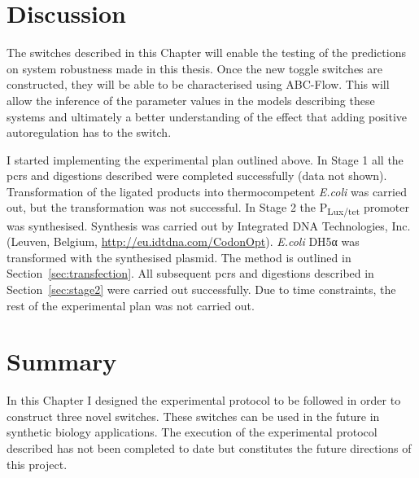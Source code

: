 
\clearpage
\section{Discussion}
The switches described in this Chapter will enable the testing of the predictions on system robustness made in this thesis. Once the new toggle switches are constructed, they will be able to be characterised using ABC-Flow. This will allow the inference of the parameter values in the models describing these systems and ultimately a better understanding of the effect that adding positive autoregulation has to the switch. 

I started implementing the experimental plan outlined above. In Stage 1 all the \acrshort{pcr}s and digestions described were completed successfully (data not shown). Transformation of the ligated products into thermocompetent \textit{E.coli} was carried out, but the transformation was not successful. In Stage 2 the P\textsubscript{Lux/tet} promoter was synthesised. Synthesis was carried out by Integrated DNA Technologies, Inc. (Leuven, Belgium, \url{http://eu.idtdna.com/CodonOpt}). \textit{E.coli} DH5α was transformed with the synthesised plasmid. The method is outlined in Section~\ref{sec:transfection}. All subsequent \acrshort{pcr}s and digestions described in Section~\ref{sec:stage2} were carried out successfully. Due to time constraints, the rest of the experimental plan was not carried out.



\section{Summary}

In this Chapter I designed the experimental protocol to be followed in order to construct three novel switches. These switches can be used in the future in synthetic biology applications. The execution of the experimental protocol described has not been completed to date but constitutes the future directions of this project.

